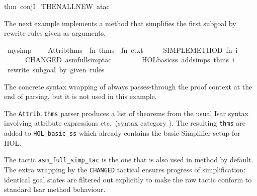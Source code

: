 \begin{isabellebody}
\isaantiq
thm\ conjI%
\endisaantiq
\ THEN{\isacharunderscore}ALL{\isacharunderscore}NEW\ atac{\isacharparenright}\ {}\ {\isacharverbatimclose}{\isacharparenright}\isanewline
\ \ \ \ \isamarkupfalse%
\isanewline
{}\isamarkupfalse%
%
\endisatagproof
{\isafoldproof}%
%
\isadelimproof
%
\endisadelimproof
%
\begin{isamarkuptext}%
\medskip The next example implements a method that simplifies
  the first subgoal by rewrite rules given as arguments.%
\end{isamarkuptext}%
\isamarkuptrue%
%
\isadelimML
%
\endisadelimML
%
\isatagML
{}\isamarkupfalse%
\ my{\isacharunderscore}simp\ {\isacharequal}\ {\isacharverbatimopen}\isanewline
\ \ Attrib{\isachardot}thms\ {\isachargreater}{\isachargreater}\ {\isacharparenleft}fn\ thms\ {\isacharequal}{\isachargreater}\ fn\ ctxt\ {\isacharequal}{\isachargreater}\isanewline
\ \ \ \ SIMPLE{\isacharunderscore}METHOD{\isacharprime}\ {\isacharparenleft}fn\ i\ {\isacharequal}{\isachargreater}\isanewline
\ \ \ \ \ \ CHANGED\ {\isacharparenleft}asm{\isacharunderscore}full{\isacharunderscore}simp{\isacharunderscore}tac\isanewline
\ \ \ \ \ \ \ \ {\isacharparenleft}HOL{\isacharunderscore}basic{\isacharunderscore}ss\ addsimps\ thms{\isacharparenright}\ i{\isacharparenright}{\isacharparenright}{\isacharparenright}\isanewline
{\isacharverbatimclose}\ {\isachardoublequoteopen}rewrite\ subgoal\ by\ given\ rules{\isachardoublequoteclose}%
\endisatagML
{\isafoldML}%
%
\isadelimML
%
\endisadelimML
%
\begin{isamarkuptext}%
The concrete syntax wrapping of \hyperlink{command.method-setup}{\mbox{}} always
  passes-through the proof context at the end of parsing, but it is
  not used in this example.

  The \verb|Attrib.thms| parser produces a list of theorems from the
  usual Isar syntax involving attribute expressions etc.\ (syntax
  category \hyperlink{syntax.thmrefs}{\mbox{}}).  The resulting \verb|thms| are
  added to \verb|HOL_basic_ss| which already contains the basic
  Simplifier setup for HOL.

  The tactic \verb|asm_full_simp_tac| is the one that is also used in
  method \hyperlink{method.simp}{\mbox{}} by default.  The extra wrapping by the \verb|CHANGED| tactical ensures progress of simplification: identical goal
  states are filtered out explicitly to make the raw tactic conform to
  standard Isar method behaviour.


\end{isamarkuptext}
\end{isabellebody}
